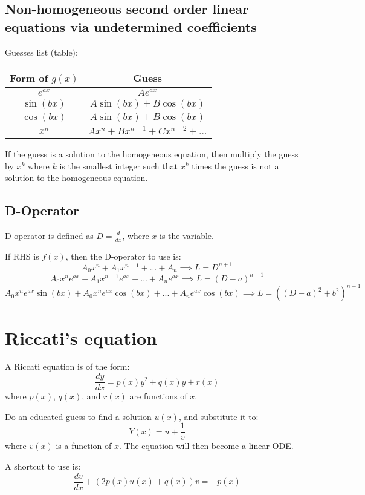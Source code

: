 \documentclass{scrartcl}
\begin{document}
\subsection{Non-homogeneous second order linear equations via undetermined coefficients}
Guesses list (table):
\begin{center}
    \begin{tabular}{|c|c|}
        \hline
        Form of \(g(x)\) & Guess \\
        \hline
        \(e^{ax}\) & \(Ae^{ax}\) \\
        \hline
        \(\sin(bx)\) & \(A\sin(bx) + B\cos(bx)\) \\
        \hline
        \(\cos(bx)\) & \(A\sin(bx) + B\cos(bx)\) \\
        \hline
        \(x^n\) & \(Ax^n + Bx^{n-1} + Cx^{n-2} + ...\) \\
        \hline
    \end{tabular}
\end{center}
If the guess is a solution to the homogeneous equation, then multiply the guess by \(x^k\) where \(k\) is the smallest integer such that \(x^k\) times the guess is not a solution to the homogeneous equation.

\subsection{D-Operator}
D-operator is defined as \(D = \frac{d}{dx}\), where \(x\) is the variable.

If RHS is \(f(x)\), then the D-operator to use is:
\[
A_0x^n + A_1x^{n-1} + ... + A_n \implies L = D^{n+1}
\]
\[
A_0x^ne^{ax} + A_1x^{n-1}e^{ax} + ... + A_n e^{ax} \implies L = (D-a)^{n+1}
\]
\[
A_0x^ne^{ax}\sin(bx) + A_0x^{n}e^{ax}\cos(bx) + ... + A_n e^{ax} \cos(bx) \implies L = ((D-a)^2 + b^2)^{n+1}
\]

\section{Riccati's equation}
A Riccati equation is of the form:
\[
\frac{dy}{dx} = p(x)y^2 + q(x)y + r(x)
\]
where \(p(x)\), \(q(x)\), and \(r(x)\) are functions of \(x\).

Do an educated guess to find a solution \(u(x)\), and substitute it to:
\[
    Y(x) = u + \frac{1}{v}
\]
where \(v(x)\) is a function of \(x\). The equation will then become a linear ODE.

A shortcut to use is:
\[
\frac{dv}{dx} + (2p(x)u(x) + q(x))v = -p(x)
\]
\end{document}
